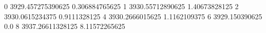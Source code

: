 0 3929.457275390625 0.306884765625
1 3930.55712890625 1.40673828125
2 3930.0615234375 0.9111328125
4 3930.2666015625 1.1162109375
6 3929.150390625 0.0
8 3937.26611328125 8.11572265625
